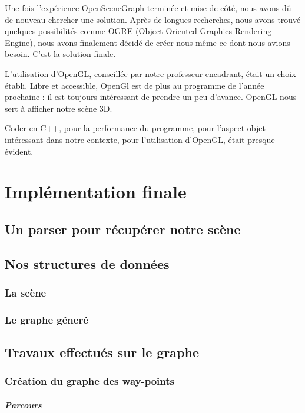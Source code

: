 \documentclass[a4paper,12pt]{report}
\begin{document}
Une fois l'expérience OpenSceneGraph terminée et mise de côté, nous avons dû de nouveau chercher une solution. Après de longues recherches, nous avons trouvé quelques possibilités comme OGRE (Object-Oriented Graphics Rendering Engine), nous avons finalement décidé de créer nous même ce dont nous avions besoin. C'est la solution finale.

L'utilisation d'OpenGL, conseillée par notre professeur encadrant, était un choix établi. Libre et accessible, OpenGl est de plus au programme de l'année prochaine : il est toujours intéressant de prendre un peu d'avance. OpenGL nous sert à afficher notre scène 3D.

Coder en C++, pour la performance du programme, pour l'aspect objet intéressant dans notre contexte, pour l'utilisation d'OpenGL, était presque évident.


\chapter{Implémentation finale}

\section{Un parser pour récupérer notre scène}

\section{Nos structures de données}

\subsection{La scène}

\subsection{Le graphe géneré}

\section{Travaux effectués sur le graphe}

\subsection{Création du graphe des way-points}

\paragraph{Parcours}
\end{document}
